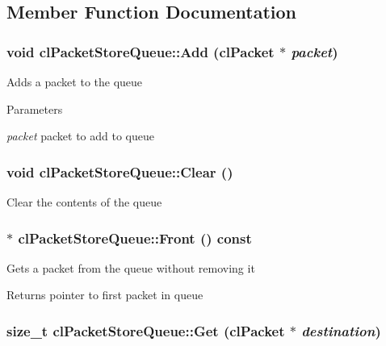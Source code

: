 \subsection{Member Function Documentation}
\hypertarget{classcl_packet_store_queue_afb416bfa29b0cc2f85beb068480d74ea}{
\subsubsection[{Add}]{\setlength{\rightskip}{0pt plus 5cm}void clPacketStoreQueue::Add ({\bf clPacket} $\ast$ {\em packet})}}
\label{classcl_packet_store_queue_afb416bfa29b0cc2f85beb068480d74ea}
Adds a packet to the queue 
\begin{DoxyParams}{Parameters}
\item[{\em packet}]packet to add to queue \end{DoxyParams}
\hypertarget{classcl_packet_store_queue_a06aa8e6dacc2183cb37f163f7f1a8a31}{
\subsubsection[{Clear}]{\setlength{\rightskip}{0pt plus 5cm}void clPacketStoreQueue::Clear ()}}
\label{classcl_packet_store_queue_a06aa8e6dacc2183cb37f163f7f1a8a31}
Clear the contents of the queue \hypertarget{classcl_packet_store_queue_aa108b947f9a6016c1034cb2b9a5ba27a}{
\subsubsection[{Front}]{ $\ast$ clPacketStoreQueue::Front () const}}
\label{classcl_packet_store_queue_aa108b947f9a6016c1034cb2b9a5ba27a}
Gets a packet from the queue without removing it \begin{DoxyReturn}{Returns}
pointer to first packet in queue 
\end{DoxyReturn}
\hypertarget{classcl_packet_store_queue_ac5758eef3544e8c4b8d4b4344cce5f2d}{
\subsubsection[{Get}]{\setlength{\rightskip}{0pt plus 5cm}size\_\-t clPacketStoreQueue::Get ({\bf clPacket} $\ast$ {\em destination})}}
